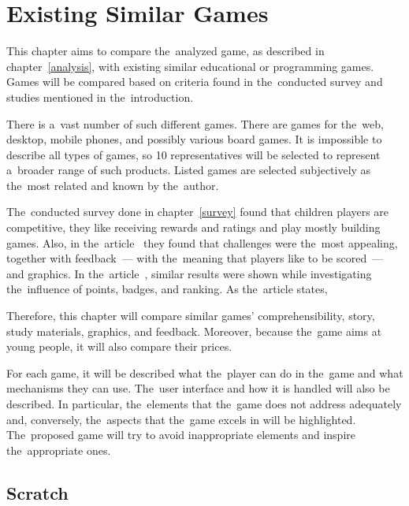 \chapter{Existing Similar Games}
\label{competitive-games}

This chapter aims to compare the~analyzed game, as described in chapter~\ref{analysis}, with existing similar educational or programming games.
Games will be compared based on criteria found in the~conducted survey and studies mentioned in the~introduction.

There is a~vast number of such different games.
There are games for the~web, desktop, mobile phones, and possibly various board games.
It is impossible to describe all types of games, so 10 representatives will be selected to represent a~broader range of such products.
Listed games are selected subjectively as the~most related and known by the~author.

The~conducted survey done in chapter~\ref{survey} found that children players are competitive, they like receiving rewards and ratings and play mostly building games.
Also, in the~article~\cite{nand_2019_engaging} they found that challenges were the~most appealing, together with feedback~--- with the~meaning that players like to be scored~--- and graphics.
In the~article~\cite{smiderle_2020_the}, similar results were shown while investigating the~influence of points, badges, and ranking.
As the~article states, 

Therefore, this chapter will compare similar games' comprehensibility, story, study materials, graphics, and feedback.
Moreover, because the~game \emph{\myAppName} aims at young people, it will also compare their prices.

For each game, it will be described what the~player can do in the~game and what mechanisms they can use.
The~user interface and how it is handled will also be described.
In particular, the~elements that the~game does not address adequately and, conversely, the~aspects that the~game excels in will be highlighted.
The~proposed game will try to avoid inappropriate elements and inspire the~appropriate ones.

\pagebreak
\section{Scratch}
\label{similar-games:scratch}

